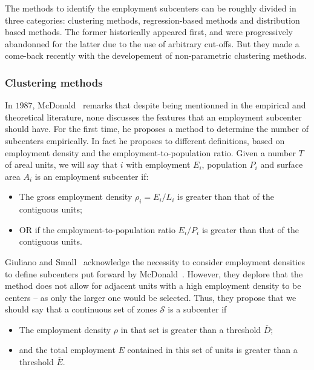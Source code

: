 The methods to identify the employment subcenters can be roughly divided in
three categories: clustering methods, regression-based methods and distribution
based methods. The former
historically appeared first, and were progressively abandonned for the latter
due to the use of arbitrary cut-offs. But they made a come-back recently with
the developement of non-parametric clustering methods.\\

\subsubsection{Clustering methods}
\label{ssub:clustering_methods}


In $1987$, McDonald~\cite{McDonald:1987} remarks that despite being mentionned
in the empirical and theoretical literature, none discusses the features that an
employment subcenter should have. For the first time, he proposes a method to
determine the number of subcenters empirically. In fact he proposes to different
definitions, based on employment density and the employment-to-population ratio. Given
a number $T$ of areal units, we will say that $i$ with employment $E_i$,
population $P_i$ and surface area $A_i$ is an employment subcenter if:

\begin{itemize}
    \item The gross employment density $\rho_i = E_i/L_i$ is greater than that
        of the contiguous units;
    \item OR if the employment-to-population ratio $E_i/P_i$ is greater than
        that of the contiguous units.
\end{itemize}


Giuliano and Small~\cite{Giuliano:1991} acknowledge the necessity to
consider employment densities to define subcenters put forward by
McDonald~\cite{McDonald:1987}. However, they deplore that the method does not
allow for adjacent units with a high employment density to be centers -- as only
the larger one would be selected. Thus, they propose that we should say that a
continuous set of zones $\mathcal{S}$ is a subcenter if 

\begin{itemize}
    \item The employment density $\rho$ in that set is greater than a threshold
        $\overline{D}$;
    \item and the total employment $E$ contained in this set of units is greater than a threshold
        $\overline{E}$.
\end{itemize}

